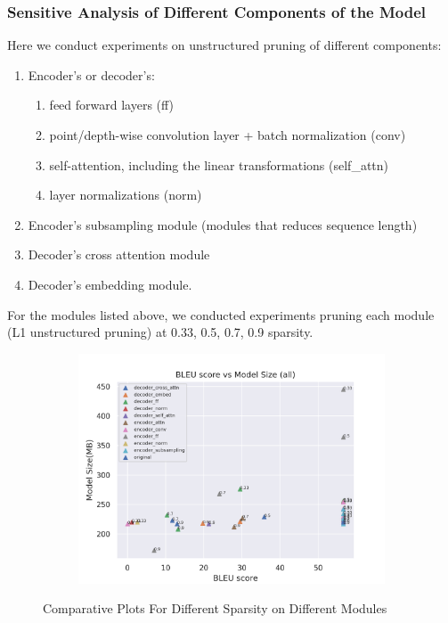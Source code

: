 \documentclass[11pt]{article}
\begin{document}
\subsubsection{Sensitive Analysis of Different Components of the Model}
Here we conduct experiments on unstructured pruning of different components:
\begin{enumerate}
    \item Encoder's or decoder's:
    \begin{enumerate}
        \item feed forward layers (ff)
        \item point/depth-wise convolution layer + batch normalization (conv)
        \item self-attention, including the linear transformations (self\_attn) 
        \item layer normalizations (norm)
    \end{enumerate}
    \item Encoder’s subsampling module (modules that reduces sequence length)
    \item Decoder’s cross attention module
    \item Decoder’s embedding module.

\end{enumerate}

For the modules listed above, we conducted experiments pruning each module (L1 unstructured pruning) at 0.33, 0.5, 0.7, 0.9 sparsity. 
\begin{figure}[h!]
    \centering
    \begin{subfigure}{0.9\textwidth}
        \includegraphics[width=\textwidth]{images/prun_modules/BLEU_vs_Model_Size_all.png}
    \end{subfigure}
    \caption{Comparative Plots For Different Sparsity on Different Modules}
    \label{fig:prun_module_all}
\end{figure}
\end{document}
